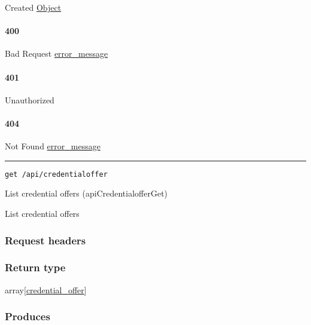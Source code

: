 Created \protect\hyperlink{Object}{Object}

\hypertarget{section-115}{%
\paragraph{400}\label{section-115}}

Bad Request \protect\hyperlink{error_message}{error\_message}

\hypertarget{section-116}{%
\paragraph{401}\label{section-116}}

Unauthorized \protect\hyperlink{}{}

\hypertarget{section-117}{%
\paragraph{404}\label{section-117}}

Not Found \protect\hyperlink{error_message}{error\_message}

\begin{center}\rule{0.5\linewidth}{\linethickness}\end{center}

\protect\hypertarget{apiCredentialofferGet}{}{}

\begin{verbatim}
get /api/credentialoffer
\end{verbatim}

List credential offers ({apiCredentialofferGet})

List credential offers

\hypertarget{request-headers-16}{%
\subsubsection{Request headers}\label{request-headers-16}}

\hypertarget{return-type-28}{%
\subsubsection{Return type}\label{return-type-28}}

array{[}\protect\hyperlink{credential_offer}{credential\_offer}{]}

\hypertarget{produces-35}{%
\subsubsection{Produces}\label{produces-35}}

